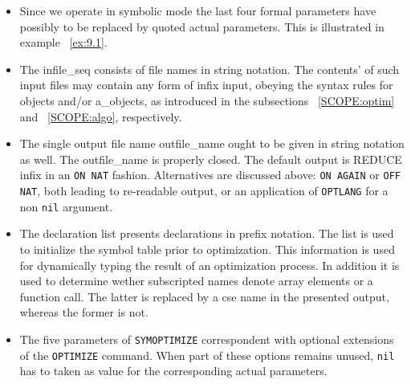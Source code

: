 {\begin{itemize}
The explicit presentation of a subset of the syntax rules for ssetq
is given to suggest that local simplification in symbolic mode can be brought
in easily by using the assignment operators {\tt lsetq}, {\tt lrsetq}
and {\tt rsetq}. The algebraic mode equivalent of these operators is
{\tt ::=}, {\tt ::=:} and {\tt :=:}, respectively. Their effect on
simplification is discussed in subsection~\ref{SCOPE:inter} and already
shown in a number of examples. In addition it is worth noting that
any (sub)expression
in a lhs\_id or a rhs may contain any number of calls to {\tt eval}.
These calls lead to simplification of their arguments, prior to optimization.
Details about the use of {\tt eval} are presented in the
GENTRAN manual~\cite{Gates:91}.
\item Since we operate in symbolic mode the last four formal parameters
have possibly to be replaced by quoted actual parameters. This is illustrated
in example ~\ref{ex:9.1}.
\item  The infile\_seq consists of  file names in string notation. The contents'
of such input files may contain any form of infix input, obeying the syntax
rules for objects and/or a\_objects, as introduced in the subsections
 ~\ref{SCOPE:optim} and ~\ref{SCOPE:algo}, respectively.
\item The single output file name  outfile\_name ought to be given in string
notation as well. The outfile\_name  is properly closed. The default output
is REDUCE infix in an {\tt ON NAT} fashion. Alternatives are discussed above:
{\tt ON AGAIN} or {\tt OFF NAT}, both leading to re-readable output, or an
application of {\tt OPTLANG} for a non {\tt nil} argument.
\item The declaration list presents declarations in prefix notation. The list
is used to initialize the symbol table prior to optimization. This
information is used for dynamically typing  the result of an optimization
process. In addition it is used to determine wether subscripted names denote
array elements or a function call. The latter is replaced by a cse name in the
presented output, whereas the former is not.
\item  The five parameters of {\tt SYMOPTIMIZE} correspondent with optional
extensions of the {\tt OPTIMIZE} command. When part of these options remains
unused, {\tt nil} has to taken as value for the corresponding actual parameters.
\end{itemize}

}

